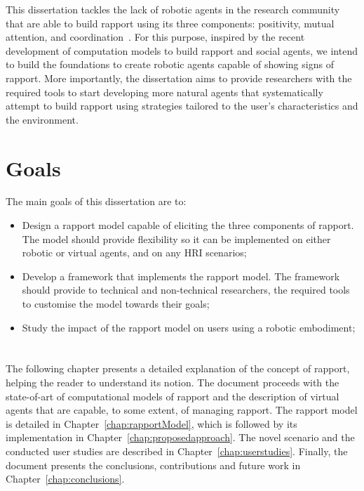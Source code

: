 This dissertation tackles the lack of robotic agents in the research community that are able to build rapport using its three components: positivity, mutual attention, and coordination~\cite{Spencer-Oatey2005}. For this purpose, inspired by the recent development of computation models to build rapport and social agents, we intend to build the foundations to create robotic agents capable of showing signs of rapport. More importantly, the dissertation aims to provide researchers with the required tools to start developing more natural agents that systematically attempt to build rapport using strategies tailored to the user's characteristics and the environment.

\section{Goals}
\label{sec:goals}

The main goals of this dissertation are to:
\begin{itemize}
	\item Design a rapport model capable of eliciting the three components of rapport. The model should provide flexibility so it can be implemented on either robotic or virtual agents, and on any \ac{HRI} scenarios;
	\item Develop a framework that implements the rapport model. The framework should provide to technical and non-technical researchers, the required tools to customise the model towards their goals;
	\item Study the impact of the rapport model on users using a robotic embodiment;
\end{itemize}

\section*{\centering *}

The following chapter presents a detailed explanation of the concept of rapport, helping the reader to understand its notion. The document proceeds with the state-of-art of computational models of rapport and the description of virtual agents that are capable, to some extent, of managing rapport. The rapport model is detailed in Chapter~\ref{chap:rapportModel}, which is followed by its implementation in Chapter~\ref{chap:proposedapproach}. The novel scenario and the conducted user studies are described in Chapter~\ref{chap:userstudies}. Finally, the document presents the conclusions, contributions and future work in Chapter~\ref{chap:conclusions}.



